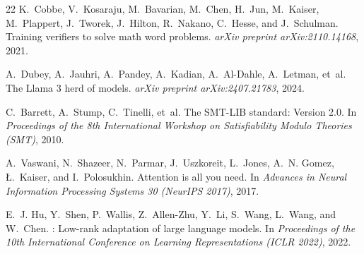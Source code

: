 \documentclass[sigconf, nonacm, onecolumn]{acmart}
\begin{document}
\begin{thebibliography}{22}
K.~Cobbe, V.~Kosaraju, M.~Bavarian, M.~Chen, H.~Jun, M.~Kaiser,
  M.~Plappert, J.~Tworek, J.~Hilton, R.~Nakano, C.~Hesse, and J.~Schulman.
\newblock Training verifiers to solve math word problems.
\newblock \emph{arXiv preprint arXiv:2110.14168}, 2021.

A.~Dubey, A.~Jauhri, A.~Pandey, A.~Kadian, A.~Al-Dahle, A.~Letman, et~al.
\newblock The Llama 3 herd of models.
\newblock \emph{arXiv preprint arXiv:2407.21783}, 2024.

C.~Barrett, A.~Stump, C.~Tinelli, et~al.
\newblock The {SMT-LIB} standard: Version 2.0.
\newblock In \emph{Proceedings of the 8th International Workshop on
  Satisfiability Modulo Theories (SMT)}, 2010.

A.~Vaswani, N.~Shazeer, N.~Parmar, J.~Uszkoreit, L.~Jones, A.~N. Gomez,
  {\L}.~Kaiser, and I.~Polosukhin.
\newblock Attention is all you need.
\newblock In \emph{Advances in Neural Information Processing Systems 30
  (NeurIPS 2017)}, 2017.

E.~J. Hu, Y.~Shen, P.~Wallis, Z.~Allen-Zhu, Y.~Li, S.~Wang, L.~Wang, and
  W.~Chen.
: Low-rank adaptation of large language models.
\newblock In \emph{Proceedings of the 10th International Conference on
  Learning Representations (ICLR 2022)}, 2022.

\end{thebibliography}
\end{document}
